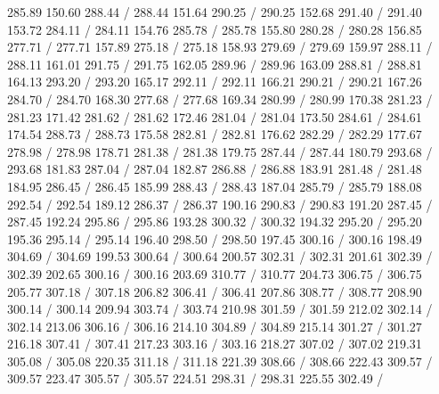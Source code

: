 { 285.89 150.60 288.44 /
 288.44 151.64 290.25 /
 290.25 152.68 291.40 /
 291.40 153.72 284.11 /
 284.11 154.76 285.78 /
 285.78 155.80 280.28 /
 280.28 156.85 277.71 /
 277.71 157.89 275.18 /
 275.18 158.93 279.69 /
 279.69 159.97 288.11 /
 288.11 161.01 291.75 /
 291.75 162.05 289.96 /
 289.96 163.09 288.81 /
 288.81 164.13 293.20 /
 293.20 165.17 292.11 /
 292.11 166.21 290.21 /
 290.21 167.26 284.70 /
 284.70 168.30 277.68 /
 277.68 169.34 280.99 /
 280.99 170.38 281.23 /
 281.23 171.42 281.62 /
 281.62 172.46 281.04 /
 281.04 173.50 284.61 /
 284.61 174.54 288.73 /
 288.73 175.58 282.81 /
 282.81 176.62 282.29 /
 282.29 177.67 278.98 /
 278.98 178.71 281.38 /
 281.38 179.75 287.44 /
 287.44 180.79 293.68 /
 293.68 181.83 287.04 /
 287.04 182.87 286.88 /
 286.88 183.91 281.48 /
 281.48 184.95 286.45 /
 286.45 185.99 288.43 /
 288.43 187.04 285.79 /
 285.79 188.08 292.54 /
 292.54 189.12 286.37 /
 286.37 190.16 290.83 /
 290.83 191.20 287.45 /
 287.45 192.24 295.86 /
 295.86 193.28 300.32 /
 300.32 194.32 295.20 /
 295.20 195.36 295.14 /
 295.14 196.40 298.50 /
 298.50 197.45 300.16 /
 300.16 198.49 304.69 /
 304.69 199.53 300.64 /
 300.64 200.57 302.31 /
 302.31 201.61 302.39 /
 302.39 202.65 300.16 /
 300.16 203.69 310.77 /
 310.77 204.73 306.75 /
 306.75 205.77 307.18 /
 307.18 206.82 306.41 /
 306.41 207.86 308.77 /
 308.77 208.90 300.14 /
 300.14 209.94 303.74 /
 303.74 210.98 301.59 /
 301.59 212.02 302.14 /
 302.14 213.06 306.16 /
 306.16 214.10 304.89 /
 304.89 215.14 301.27 /
 301.27 216.18 307.41 /
 307.41 217.23 303.16 /
 303.16 218.27 307.02 /
 307.02 219.31 305.08 /
 305.08 220.35 311.18 /
 311.18 221.39 308.66 /
 308.66 222.43 309.57 /
 309.57 223.47 305.57 /
 305.57 224.51 298.31 /
 298.31 225.55 302.49 /
}
